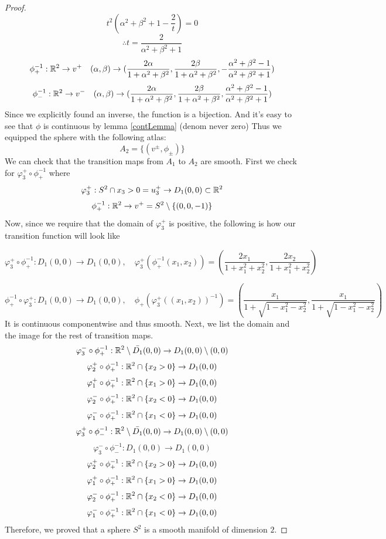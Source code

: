 \documentclass[11pt,a4paper]{report}
\begin{document}
\begin{proof}
$$ t^2 (\alpha^2 + \beta^2 +1 - \frac{2}{t} ) = 0 $$
$$ \therefore t = \frac{2}{\alpha^2 + \beta^2 +1 } $$
$$ \phi_{+}^{-1}:
\mathbb{R}^2 \to v^{+} 
\quad (\alpha, \beta)  \to
( \frac{2 \alpha}{1+\alpha^2+\beta^2},
  \frac{2 \beta}{1+\alpha^2+\beta^2},
  - \frac{\alpha^2+\beta^2-1}{\alpha^2+\beta^2+1})
$$
$$ \phi_{-}^{-1}:
\mathbb{R}^2 \to v^{-}
\quad (\alpha,\beta) \to
( \frac{2\alpha}{1+\alpha^2+\beta^2}, 
\frac{2\beta}{1+\alpha^2+\beta^2}, 
 \frac{\alpha^2 + \beta^2 -1}{\alpha^2+\beta^2+1} )
$$
Since we explicitly found an inverse, the function is a bijection.
\newline
And it's easy to see that $\phi$ is continuous by lemma \ref{contLemma} (denom never zero)
Thus we equipped the sphere with the following atlas:
$$ A_2 = \{(v^{\pm},\phi_{\pm}) \} $$
We can check that the transition maps from $A_1$ to $A_2$ are smooth. \newline
First we check for $\varphi_3^{+} \circ \phi_{+}^{-1}$ where
$$ \varphi_3^{+}: S^2 \cap {x_3 > 0} = u_3^{+} \to D_1(0,0) \subset \mathbb{R}^2 $$
$$ \phi_{+}^{-1}: \mathbb{R}^2 \to v^{+} = S^2 \setminus \{ (0,0,-1) \} $$
Now, since we require that the domain of $\varphi_3^{+}$ is positive, the following is how our transition function will look like

$$\varphi_3^{+} \circ \phi_{+}^{-1}: D_1 (0,0) \to D_1(0,0), \quad \varphi_3^{+}( \phi_{+}^{-1}(x_1,x_2)) = (\frac{2x_1}{1+x_1^2+x_2^2}, \frac{2x_2}{1+x_1^2+x_2^2})$$

$$ \phi_{+}^{-1} \circ \varphi_3^{+}: D_1 (0,0) \to D_1(0,0), \quad  \phi_{+}(\varphi_3^{+}((x_1,x_2) )^{-1}) = (\frac{x_1}{1+\sqrt{1-x_1^2-x_2^2}}, \frac{x_1}{1+\sqrt{1-x_1^2-x_2^2}})$$
It is continuous componentwise and thus smooth.
Next, we list the domain and the image for the rest of transition maps.
$$\varphi_3^{-} \circ \phi_{+}^{-1}: \mathbb{R}^2 \setminus \bar{D_1} (0,0) \to D_1(0,0) \setminus (0,0)$$
$$\varphi_2^{+} \circ \phi_{+}^{-1}: \mathbb{R}^2 \cap \{ x_2 > 0 \} \to D_1 (0,0)$$
$$\varphi_1^{+} \circ \phi_{+}^{-1}: \mathbb{R}^2 \cap \{ x_1 > 0 \} \to D_1 (0,0)$$
$$\varphi_2^{-} \circ \phi_{+}^{-1}: \mathbb{R}^2 \cap \{ x_2 < 0 \} \to D_1 (0,0)$$
$$\varphi_1^{-} \circ \phi_{+}^{-1}: \mathbb{R}^2 \cap \{ x_1 < 0 \} \to D_1 (0,0)$$
$$\varphi_3^{+} \circ \phi_{-}^{-1}: \mathbb{R}^2 \setminus \bar{D_1} (0,0) \to D_1(0,0) \setminus (0,0)$$
$$\varphi_3^{-} \circ \phi_{-}^{-1}: D_1 (0,0) \to D_1(0,0) $$
$$\varphi_2^{+} \circ \phi_{+}^{-1}: \mathbb{R}^2 \cap \{ x_2 > 0 \} \to D_1 (0,0)$$
$$\varphi_1^{+} \circ \phi_{+}^{-1}: \mathbb{R}^2 \cap \{ x_1 > 0 \} \to D_1 (0,0)$$
$$\varphi_2^{-} \circ \phi_{+}^{-1}: \mathbb{R}^2 \cap \{ x_2 < 0 \} \to D_1 (0,0)$$
$$\varphi_1^{-} \circ \phi_{+}^{-1}: \mathbb{R}^2 \cap \{ x_1 < 0 \} \to D_1 (0,0)$$
Therefore, we proved that a sphere $S^2$ is a smooth manifold of dimension $2$.
\end{proof}
\end{document}
